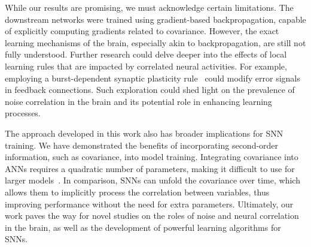 While our results are promising, we must acknowledge certain limitations. 
The downstream networks were trained using gradient-based backpropagation, capable of explicitly computing gradients related to covariance. 
However, the exact learning mechanisms of the brain, especially akin to backpropagation, are still not fully understood.  
Further research could delve deeper into the effects of local learning rules that are impacted by correlated neural activities.
For example, employing a burst-dependent synaptic plasticity rule~\cite{Payeur2021} could modify error signals in feedback connections. 
Such exploration could shed light on the prevalence of noise correlation in the brain and its potential role in enhancing learning processes.

The approach developed in this work also has broader implications for SNN training. 
We have demonstrated the benefits of incorporating second-order information, such as covariance, into model training. 
Integrating covariance into ANNs requires a quadratic number of parameters, making it difficult to use for larger models~\cite{Wang2020}. 
In comparison, SNNs can unfold the covariance over time, which allows them to implicitly process the correlation between variables, thus improving performance without the need for extra parameters.
Ultimately, our work paves the way for novel studies on the roles of noise and neural correlation in the brain, as well as the development of powerful learning algorithms for SNNs.
